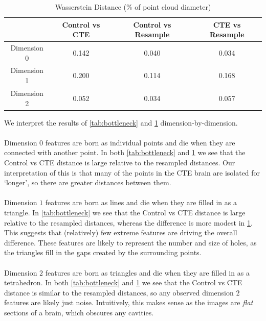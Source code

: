 \begin{table}[h]
\centering
\begin{tabular}{|c|c|c|c|}
\hline
 & Control vs CTE & Control vs Resample & CTE vs Resample \\ \hline
Dimension 0 & 0.142 & 0.040 & 0.034 \\ \hline
Dimension 1 & 0.200 & 0.114 & 0.168 \\ \hline
Dimension 2 & 0.052 & 0.034 & 0.057 \\ \hline
\end{tabular}
\caption{Wasserstein Distance (\% of point cloud diameter)}
\label{tab:wasserstein}
\end{table}
\noindent
We interpret the results of \cref{tab:bottleneck} and \cref{tab:wasserstein} dimension-by-dimension.
\\\\
Dimension $0$ features are born as individual points and die when they are connected with another point. In both \cref{tab:bottleneck} and \cref{tab:wasserstein} we see that the Control vs CTE distance is large relative to the resampled distances. Our interpretation of this is that many of the points in the CTE brain are isolated for `longer', so there are greater distances between them.
\\\\
Dimension $1$ features are born as lines and die when they are filled in as a triangle. In \cref{tab:bottleneck} we see that the Control vs CTE distance is large relative to the resampled distances, whereas the difference is more modest in \cref{tab:wasserstein}. This suggests that (relatively) few extreme features are driving the overall difference. These features are likely to represent the number and size of holes, as the triangles fill in the gaps created by the surrounding points.
\\\\
Dimension $2$ features are born as triangles and die when they are filled in as a tetrahedron. In both \cref{tab:bottleneck} and \cref{tab:wasserstein} we see that the Control vs CTE distance is similar to the resampled distances, so any observed dimension $2$ features are likely just noise. Intuitively, this makes sense as the images are \textit{flat} sections of a brain, which obscures any cavities.
